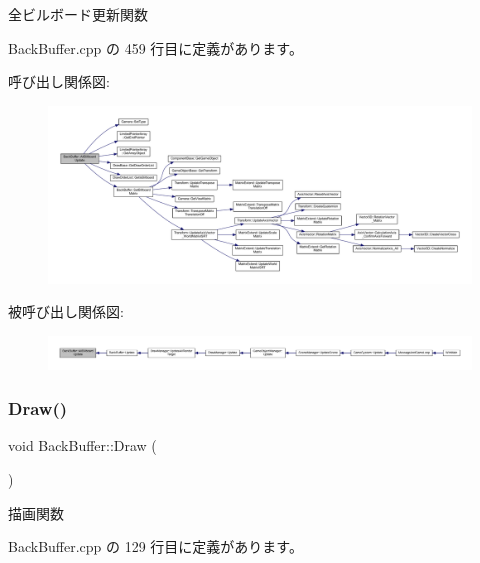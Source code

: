 全ビルボード更新関数 



 Back\+Buffer.\+cpp の 459 行目に定義があります。

呼び出し関係図\+:\nopagebreak
\begin{figure}[H]
\begin{center}
\leavevmode
\includegraphics[width=350pt]{class_back_buffer_a1b93b223c80549e7b11e1d91b56552bc_cgraph}
\end{center}
\end{figure}
被呼び出し関係図\+:
\nopagebreak
\begin{figure}[H]
\begin{center}
\leavevmode
\includegraphics[width=350pt]{class_back_buffer_a1b93b223c80549e7b11e1d91b56552bc_icgraph}
\end{center}
\end{figure}
\mbox{\label{class_back_buffer_adb51191c002489e4faac54199449e9ef}} 
\subsubsection{\texorpdfstring{Draw()}{Draw()}}
{\footnotesize\ttfamily void Back\+Buffer\+::\+Draw (\begin{DoxyParamCaption}{ }\end{DoxyParamCaption})}



描画関数 



 Back\+Buffer.\+cpp の 129 行目に定義があります。

